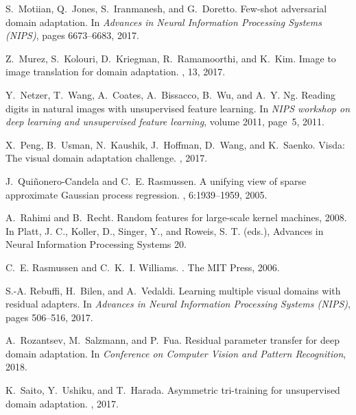 \documentclass[10pt,letterpaper]{article}
\begin{document}
\begin{thebibliography}{10}
S.~Motiian, Q.~Jones, S.~Iranmanesh, and G.~Doretto.
\newblock Few-shot adversarial domain adaptation.
\newblock In {\em Advances in Neural Information Processing Systems (NIPS)},
  pages 6673--6683, 2017.

Z.~Murez, S.~Kolouri, D.~Kriegman, R.~Ramamoorthi, and K.~Kim.
\newblock Image to image translation for domain adaptation.
, 13, 2017.

Y.~Netzer, T.~Wang, A.~Coates, A.~Bissacco, B.~Wu, and A.~Y. Ng.
\newblock Reading digits in natural images with unsupervised feature learning.
\newblock In {\em NIPS workshop on deep learning and unsupervised feature
  learning}, volume 2011, page~5, 2011.

X.~Peng, B.~Usman, N.~Kaushik, J.~Hoffman, D.~Wang, and K.~Saenko.
\newblock Visda: The visual domain adaptation challenge.
, 2017.

J.~Qui{\~{n}}onero-Candela and C.~E. Rasmussen.
\newblock A unifying view of sparse approximate {G}aussian process regression.
, 6:1939--1959, 2005.

A.~Rahimi and B.~Recht.
\newblock Random features for large-scale kernel machines, 2008.
\newblock In Platt, J. C., Koller, D., Singer, Y., and Roweis, S. T. (eds.),
  Advances in Neural Information Processing Systems 20.

C.~E. Rasmussen and C.~K.~I. Williams.
.
\newblock The MIT Press, 2006.

S.-A. Rebuffi, H.~Bilen, and A.~Vedaldi.
\newblock Learning multiple visual domains with residual adapters.
\newblock In {\em Advances in Neural Information Processing Systems (NIPS)},
  pages 506--516, 2017.

A.~Rozantsev, M.~Salzmann, and P.~Fua.
\newblock Residual parameter transfer for deep domain adaptation.
\newblock In {\em Conference on Computer Vision and Pattern Recognition}, 2018.

K.~Saito, Y.~Ushiku, and T.~Harada.
\newblock Asymmetric tri-training for unsupervised domain adaptation.
, 2017.


\end{thebibliography}
\end{document}
